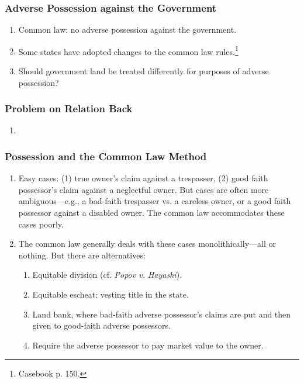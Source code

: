 \subsubsection{Adverse Possession against the Government}

\begin{enumerate}
    \item Common law: no adverse possession against the government.
    \item Some states have adopted changes to the common law 
    rules.\footnote{Casebook p. 150.}
    \item Should government land be treated differently for purposes of 
    adverse possession?
\end{enumerate}

\subsubsection{Problem on Relation Back}

\begin{enumerate}
    \item %
\end{enumerate}

\subsubsection{Possession and the Common Law Method}

\begin{enumerate}
    \item Easy cases: (1) true owner's claim against a trespasser, (2) good 
    faith possessor's claim against a neglectful owner. But cases are often 
    more ambiguous---e.g., a bad-faith trespasser vs. a careless owner, or a 
    good faith possessor against a disabled owner. The common law accommodates 
    these cases poorly.
    \item The common law generally deals with these cases monolithically---all 
    or nothing. But there are alternatives:
    \begin{enumerate}
        \item Equitable division (cf. \emph{Popov v. Hayashi}).
        \item Equitable escheat: vesting title in the state.
        \item Land bank, where bad-faith adverse possessor's claims are put 
        and then given to good-faith adverse possessors.
        \item Require the adverse possessor to pay market value to the owner.
    \end{enumerate}
\end{enumerate}

